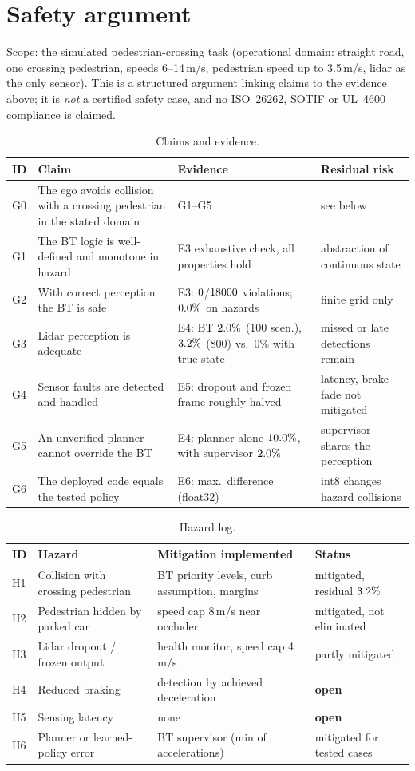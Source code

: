 \section{Safety argument}
Scope: the simulated pedestrian-crossing task (operational domain: straight road, one crossing pedestrian, speeds 6--14\,m/s, pedestrian speed up to 3.5\,m/s, lidar as the only sensor). This is a structured argument linking claims to the evidence above; it is \emph{not} a certified safety case, and no ISO~26262, SOTIF or UL~4600 compliance is claimed.
\begin{table}[H]\centering\small
\begin{tabularx}{\linewidth}{lYYY}\toprule
ID & Claim & Evidence & Residual risk\\\midrule
G0 & The ego avoids collision with a crossing pedestrian in the stated domain & G1--G5 & see below\\
G1 & The BT logic is well-defined and monotone in hazard & E3 exhaustive check, all properties hold & abstraction of continuous state\\
G2 & With correct perception the BT is safe & E3: $0$/$18000$ violations; $0.0\%$ on hazards & finite grid only\\
G3 & Lidar perception is adequate & E4: BT $2.0\%$ (100 scen.), $3.2\%$ (800) vs.\ $0\%$ with true state & missed or late detections remain\\
G4 & Sensor faults are detected and handled & E5: dropout and frozen frame roughly halved & latency, brake fade not mitigated\\
G5 & An unverified planner cannot override the BT & E4: planner alone $10.0\%$, with supervisor $2.0\%$ & supervisor shares the perception\\
G6 & The deployed code equals the tested policy & E6: max.\ difference \embFlerr{} (float32) & int8 changes hazard collisions\\\bottomrule
\end{tabularx}
\caption{Claims and evidence.}
\end{table}
\begin{table}[H]\centering\small
\begin{tabularx}{\linewidth}{lYYY}\toprule
ID & Hazard & Mitigation implemented & Status\\\midrule
H1 & Collision with crossing pedestrian & BT priority levels, curb assumption, margins & mitigated, residual $3.2\%$\\
H2 & Pedestrian hidden by parked car & speed cap 8\,m/s near occluder & mitigated, not eliminated\\
H3 & Lidar dropout / frozen output & health monitor, speed cap 4\,m/s & partly mitigated\\
H4 & Reduced braking & detection by achieved deceleration & \textbf{open}\\
H5 & Sensing latency & none & \textbf{open}\\
H6 & Planner or learned-policy error & BT supervisor (min of accelerations) & mitigated for tested cases\\\bottomrule
\end{tabularx}
\caption{Hazard log.}
\end{table}
